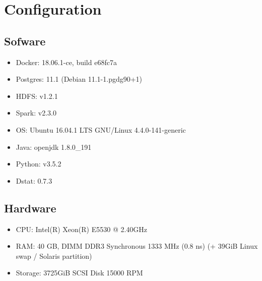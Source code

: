 \documentclass[main.tex]{subfiles}
\begin{document}
    \section{Configuration}
    \subsection{Sofware}
    \begin{itemize}
        \item 
        Docker: 18.06.1-ce, build e68fc7a
        \item
        Postgres: 11.1 (Debian 11.1-1.pgdg90+1)
        \item
        HDFS: v1.2.1
        \item
        Spark: v2.3.0
        \item
        OS: Ubuntu 16.04.1 LTS GNU/Linux 4.4.0-141-generic
        \item
        Java: openjdk 1.8.0\_191
        \item
        Python: v3.5.2
        \item
        Dstat: 0.7.3
    \end{itemize}
    \subsection{Hardware}
    \begin{itemize}
        \item 
        CPU: Intel(R) Xeon(R) E5530 @ 2.40GHz
        \item 
        RAM: 40 GB, DIMM DDR3 Synchronous 1333 MHz (0.8 ns) (+ 39GiB Linux swap / Solaris partition)
        \item 
        Storage: 3725GiB SCSI Disk 15000 RPM
    \end{itemize}
\end{document}
